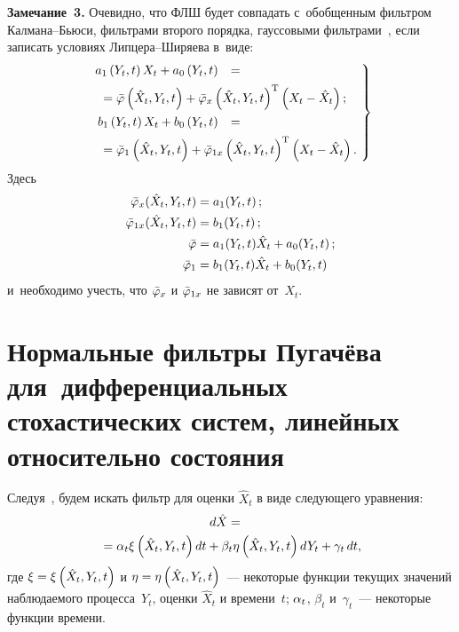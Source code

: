 \begin{multicols}{2}
\smallskip

\noindent
\textbf{Замечание~3.}
 Очевидно, что ФЛШ будет совпадать с~обобщенным фильтром Кал\-ма\-на--Бью\-си, фильтрами второго порядка, гауссовыми фильтрами~\cite{1-sin, 6-sin, 8-sin}, если записать условиях Лип\-це\-ра--Ши\-ря\-ева в~виде:
\begin{equation}
    \left.
    \begin{array}{rl}
   \hspace*{-1.5mm}a_1\left(Y_t, t\right) X_t + a_0 \left(Y_t, t\right) &= {}\\[5pt]
    &\hspace*{-37mm}{}=\bar \vrp \left(\hat{X}_t,Y_t, t\right) + \bar\vrp_x \left(\hat{X}_t,Y_t, t\right)^{\mathrm{T}} \left(X_t-\hat{X}_t\right);\\[7pt]
      \hspace*{-1.5mm}b_1\left(Y_t, t\right) X_t + b_0 \left(Y_t, t\right) &={}\\[5pt]
   &\hspace*{-37mm}{}=\bar\vrp_1 \left(\hat{X}_t,Y_t, t\right)+\bar\vrp_{1x}\left(\hat{X}_t,Y_t, t\right)^{\mathrm{T}} \left(X_t-\hat{X}_t\right).
   \end{array}\!
   \right\}\!\!
   \label{e8-sin}
   \end{equation}
Здесь
\begin{align*}
\bar{\varphi}_x(\hat{X}_t,Y_t, t) &= a_1(Y_t, t)\,;\\
 \bar{\varphi}_{1x}(\hat{X}_t,Y_t, t) &=b_1(Y_t,t)\,;\\
 \bar{\varphi} &=  a_1(Y_t, t) \hat{X}_t+a_0(Y_t, t)\,;\\
  \bar{\varphi}_1 &=  b_1 (Y_t, t) \hat{X}_t+b_0 (Y_t, t)
  \end{align*}
и~необходимо учесть, что $\bar{\varphi}_x$ и $\bar {\varphi}_{1x}$ не зависят от~$X_t$.

\section{Нормальные фильтры Пугачёва для~дифференциальных стохастических систем, линейных относительно состояния}

Следуя~\cite{1-sin}, будем искать фильтр для оценки $\hat{X}_t$ в виде следующего уравнения:
\begin{multline}
\hspace*{-2mm}d\hat{X} ={}\\
\hspace*{-1mm}{}=\alp_t \xi \yhxt dt + \beta_t\eta \yhxt dY_t +
    \gamma_t\, dt,\!\!\label{e9-sin}
    \end{multline}
где  $\xi =\xi \left({\hat X}_t,Y_t, t\right)$ и $\eta\hm=\eta\yhxt$~--- некоторые функции
текущих значений наблюдаемого процесса~$Y_t$, оценки $\hat{X}_t$ и
времени~$t$; $\alpha_t$, $\beta_t$ и~$\gamma_t$~--- некоторые
функции времени.


\end{multicols}
